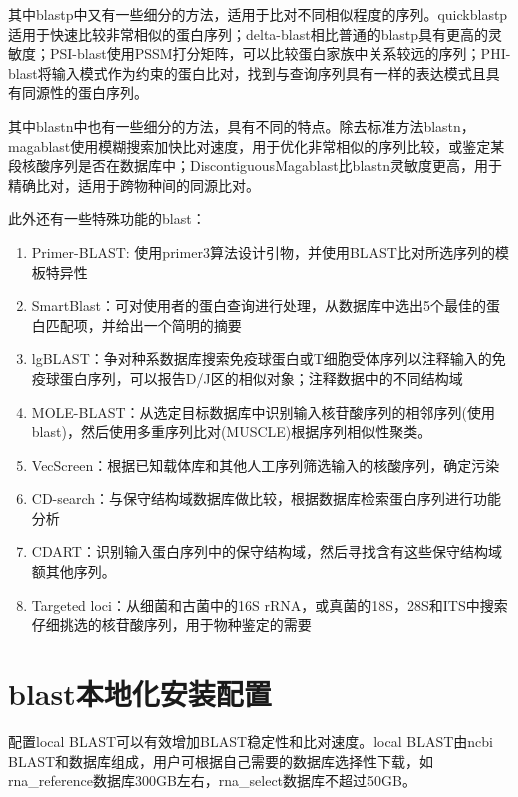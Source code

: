 其中blastp中又有一些细分的方法，适用于比对不同相似程度的序列。quickblastp适用于快速比较非常相似的蛋白序列；delta-blast相比普通的blastp具有更高的灵敏度；PSI-blast使用PSSM打分矩阵，可以比较蛋白家族中关系较远的序列；PHI-blast将输入模式作为约束的蛋白比对，找到与查询序列具有一样的表达模式且具有同源性的蛋白序列。\par
其中blastn中也有一些细分的方法，具有不同的特点。除去标准方法blastn，magablast使用模糊搜索加快比对速度，用于优化非常相似的序列比较，或鉴定某段核酸序列是否在数据库中；DiscontiguousMagablast比blastn灵敏度更高，用于精确比对，适用于跨物种间的同源比对。\par
此外还有一些特殊功能的blast：
\begin{enumerate}
    \item Primer-BLAST: 使用primer3算法设计引物，并使用BLAST比对所选序列的模板特异性
    \item SmartBlast：可对使用者的蛋白查询进行处理，从数据库中选出5个最佳的蛋白匹配项，并给出一个简明的摘要
    \item lgBLAST：争对种系数据库搜索免疫球蛋白或T细胞受体序列以注释输入的免疫球蛋白序列，可以报告D/J区的相似对象；注释数据中的不同结构域
    \item MOLE-BLAST：从选定目标数据库中识别输入核苷酸序列的相邻序列(使用blast)，然后使用多重序列比对(MUSCLE)根据序列相似性聚类。
    \item VecScreen：根据已知载体库和其他人工序列筛选输入的核酸序列，确定污染
    \item CD-search：与保守结构域数据库做比较，根据数据库检索蛋白序列进行功能分析
    \item CDART：识别输入蛋白序列中的保守结构域，然后寻找含有这些保守结构域额其他序列。
    \item Targeted loci：从细菌和古菌中的16S rRNA，或真菌的18S，28S和ITS中搜索仔细挑选的核苷酸序列，用于物种鉴定的需要
\end{enumerate}

\section{blast本地化安装配置}
配置local BLAST可以有效增加BLAST稳定性和比对速度。local BLAST由ncbi BLAST和数据库组成，用户可根据自己需要的数据库选择性下载，如rna\_reference数据库300GB左右，rna\_select数据库不超过50GB。

